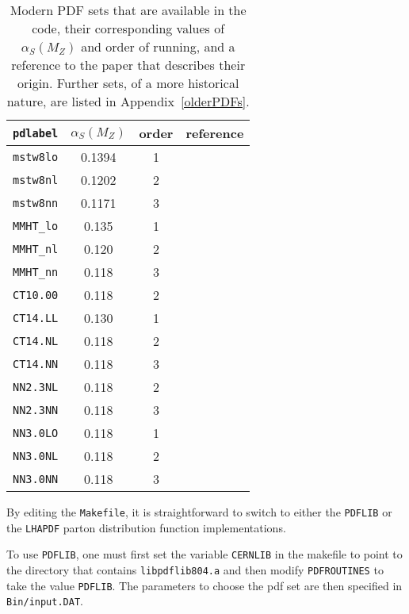 \documentclass[12pt]{article}
\begin{document}
\begin{table}[h]
\begin{center}
\begin{tabular}{|c|c|c|c|}
\hline
{\tt pdlabel}  & $\alpha_S(M_Z)$ & order & reference \\
\hline
{\tt mstw8lo}  & 0.1394 & 1     & \cite{Martin:2009iq} \\
{\tt mstw8nl}  & 0.1202 & 2     & \cite{Martin:2009iq} \\
{\tt mstw8nn}  & 0.1171 & 3     & \cite{Martin:2009iq} \\
{\tt MMHT\_lo}  & 0.135  & 1     & \cite{Harland-Lang:2014zoa} \\
{\tt MMHT\_nl}  & 0.120  & 2     & \cite{Harland-Lang:2014zoa} \\
{\tt MMHT\_nn}  & 0.118  & 3     & \cite{Harland-Lang:2014zoa} \\
\hline
{\tt CT10.00}  & 0.118  & 2     & \cite{Lai:2010vv} \\
{\tt CT14.LL}  & 0.130  & 1     & \cite{Dulat:2015mca} \\
{\tt CT14.NL}  & 0.118  & 2     & \cite{Dulat:2015mca} \\
{\tt CT14.NN}  & 0.118  & 3     & \cite{Dulat:2015mca} \\
\hline
{\tt NN2.3NL}  & 0.118  & 2     & \cite{Ball:2012cx} \\
{\tt NN2.3NN}  & 0.118  & 3     & \cite{Ball:2012cx} \\
{\tt NN3.0LO}  & 0.118  & 1     & \cite{Ball:2014uwa} \\
{\tt NN3.0NL}  & 0.118  & 2     & \cite{Ball:2014uwa} \\
{\tt NN3.0NN}  & 0.118  & 3     & \cite{Ball:2014uwa} \\
\hline
\end{tabular}
\end{center}
\caption{Modern PDF sets that are available in the code,
their corresponding values of $\alpha_S(M_Z)$ and order of running,
and a reference to the paper
that describes their origin.  Further sets, of a more historical nature, are
listed in Appendix~\ref{olderPDFs}.
\label{pdlabelrecent}}
\end{table}

By editing the {\tt Makefile}, it is straightforward to switch to
either the {\tt PDFLIB} or the {\tt LHAPDF} parton distribution
function implementations.

To use {\tt PDFLIB}, one must first set the variable {\tt CERNLIB}
in the makefile to point to the directory that contains
{\tt libpdflib804.a} and then modify {\tt PDFROUTINES} to
take the value {\tt PDFLIB}. The parameters to choose the
pdf set are then specified in {\tt Bin/input.DAT}.
\end{document}
